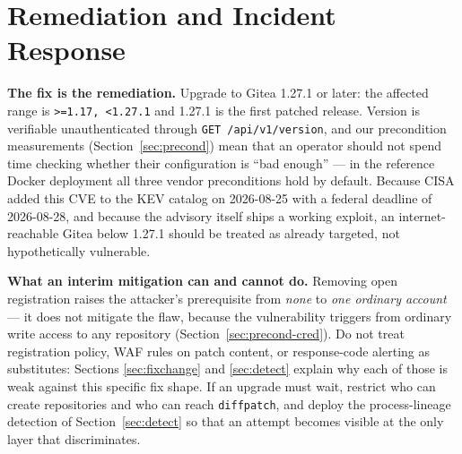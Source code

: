 \section{Remediation and Incident Response}
\label{sec:remediation}

\textbf{The fix is the remediation.} Upgrade to Gitea 1.27.1 or later: the
affected range is \texttt{>=1.17, <1.27.1} and 1.27.1 is the first patched
release. Version is verifiable unauthenticated through
\texttt{GET /api/v1/version}, and our precondition measurements
(Section~\ref{sec:precond}) mean that an operator should not spend time
checking whether their configuration is ``bad enough'' --- in the reference
Docker deployment all three vendor preconditions hold by default. Because
CISA added this CVE to the KEV catalog on 2026-08-25 with a federal deadline
of 2026-08-28, and because the advisory itself ships a working exploit, an
internet-reachable Gitea below 1.27.1 should be treated as already targeted,
not hypothetically vulnerable.

\textbf{What an interim mitigation can and cannot do.} Removing open
registration raises the attacker's prerequisite from \emph{none} to
\emph{one ordinary account} --- it does not mitigate the flaw, because the
vulnerability triggers from ordinary write access to any repository
(Section~\ref{sec:precond-cred}). Do not treat registration policy, WAF rules
on patch content, or response-code alerting as substitutes: Sections
\ref{sec:fixchange} and \ref{sec:detect} explain why each of those is weak
against this specific fix shape. If an upgrade must wait, restrict who can
create repositories and who can reach \texttt{diffpatch}, and deploy the
process-lineage detection of Section~\ref{sec:detect} so that an attempt
becomes visible at the only layer that discriminates.

